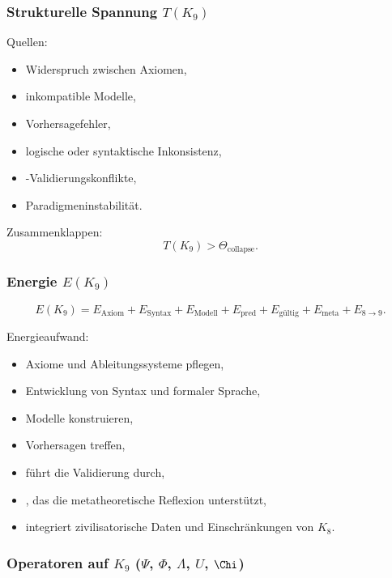 \subsubsection{Strukturelle Spannung \texorpdfstring{$T(K_9)$}{T(K_9)}}

Quellen:
\begin{itemize}
    \item Widerspruch zwischen Axiomen,
    \item inkompatible Modelle,
    \item Vorhersagefehler,
    \item logische oder syntaktische Inkonsistenz,
    \item-Validierungskonflikte,
    \item Paradigmeninstabilität.
\end{itemize}

Zusammenklappen:
\[
T(K_9) > \Theta_{\mathrm{collapse}}.
\]

\subsubsection{Energie \texorpdfstring{$E(K_9)$}{E(K_9)}}

\[
E(K_9)=
E_{\mathrm{Axiom}}+
E_{\mathrm{Syntax}}+
E_{\mathrm{Modell}}+
E_{\mathrm{pred}}+
E_{\mathrm{gültig}}+
E_{\mathrm{meta}}+
E_{8\to9}.
\]

Energieaufwand:
\begin{itemize}
    \item Axiome und Ableitungssysteme pflegen,
    \item Entwicklung von Syntax und formaler Sprache,
    \item Modelle konstruieren,
    \item Vorhersagen treffen,
    \item führt die Validierung durch,
    \item, das die metatheoretische Reflexion unterstützt,
    \item integriert zivilisatorische Daten und Einschränkungen von $K_8$.
\end{itemize}

\subsubsection{Operatoren auf \texorpdfstring{$K_9$}{K_9} (\texorpdfstring{$\Psi$}{\Psi}, \texorpdfstring{$\Phi$}{\Phi}, \texorpdfstring{$\Lambda$}{\Lambda}, \texorpdfstring{$U$}{U}, \texorpdfstring{$\Chi$}{\Chi})}

